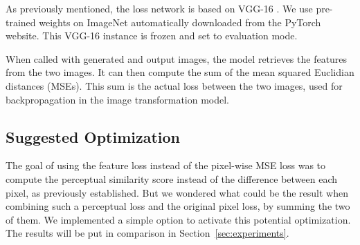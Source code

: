 \documentclass{article}
\begin{document}
{    As previously mentioned, the loss network is based on VGG-16 \citep{vgg}. We use pre-trained weights on ImageNet \citep{image-net} automatically downloaded from the PyTorch website. This VGG-16 instance is frozen and set to evaluation mode.

    \bigskip

    When called with generated and output images, the model retrieves the features from the two images. It can then compute the sum of the mean squared Euclidian distances (MSEs). This sum is the actual loss between the two images, used for backpropagation in the image transformation model.

    \subsection{Suggested Optimization}
    \label{subsec:suggested-optimization}

    The goal of using the feature loss instead of the pixel-wise MSE loss was to compute the perceptual similarity score instead of the difference between each pixel, as previously established. But we wondered what could be the result when combining such a perceptual loss and the original pixel loss, by summing the two of them. We implemented a simple option to activate this potential optimization. The results will be put in comparison in Section~\ref{sec:experiments}.
}
\end{document}
